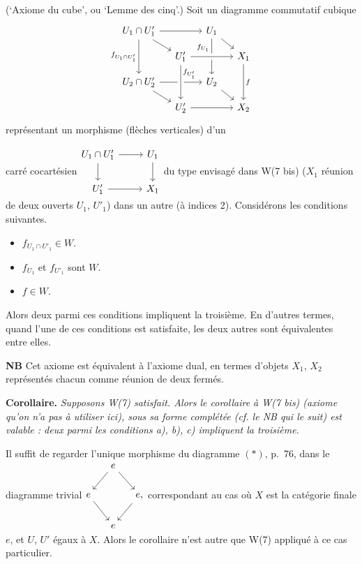 \documentclass[11pt]{article}
\newcommand{\msp}[1]{\marginpar{\footnotesize [#1]}}
\begin{document}
\begin{description}[leftmargin=5em, style=sameline]
\item[W(7)] (`Axiome du cube', ou `Lemme des cinq'.) Soit un diagramme commutatif cubique
\[
\begin{tikzcd}[row sep=small, column sep=small]
U_1\cap U'_1 \arrow[rr] \arrow[dr] \arrow[dd, "f_{U_1\cap U'_1}"'] & & U_1 \arrow[dr] \arrow[dd, "f_{U_1}"{swap,pos=.25}] & \\
& U'_1 \arrow[rr, crossing over] & & X_1 \arrow[dd, "f"] \\
U_2\cap U'_2 \arrow[rr] \arrow[dr] & & U_2 \arrow[dr] & \\
& U'_2 \arrow[rr] \arrow[from=uu, crossing over, "f_{U'_1}"{pos=.25}] & & X_2
\end{tikzcd}
\]
représentant un morphisme (flèches verticales) d'un

\msp{page 77}
carré cocartésien\quad $\vcenter{\hbox{\begin{tikzcd}
U_1\cap U'_1 \arrow[r] \arrow[d] & U_1 \arrow[d] \\
U'_1 \arrow[r] & X_1
\end{tikzcd}}}$\quad du type envisagé dans W(7 bis) ($X_1$ réunion de deux ouverts $U_1$, $U'_1$) dans un autre (à indices 2). Considérons les conditions suivantes.

\begin{itemize}
\item[a)] $f_{U_1\cap U'_1}\in W$.
\item[b)] $f_{U_1}$ et $f_{U'_1}$ sont $W$.
\item[c)] $f\in W$.
\end{itemize}

Alors deux parmi ces conditions impliquent la troisième. En d'autres termes, quand l'une de ces conditions est satisfaite, les deux autres sont équivalentes entre elles.
\end{description}

\textbf{NB} Cet axiome est équivalent à l'axiome dual, en termes d'objets $X_1$, $X_2$ représentés chacun comme réunion de deux fermés.

\textbf{Corollaire.} \textit{Supposons \textup{W(7)} satisfait. Alors le corollaire à \textup{W(7 bis)} (axiome qu'on n'a pas à utiliser ici), sous sa forme complétée (cf. le NB qui le suit) est valable : deux parmi les conditions a), b), c) impliquent la troisième.}

Il suffit de regarder l'unique morphisme du diagramme $(*)$, p.~76, dans le diagramme trivial\quad $\vcenter{\hbox{\begin{tikzcd}[column sep=small]
& e \arrow[dl] \arrow[dr] & \\
e \arrow[dr] & & e, \arrow[dl] \\
& e &
\end{tikzcd}}}$\quad correspondant au cas où $X$ est la catégorie finale $e$, et $U$, $U'$ égaux à $X$. Alors le corollaire n'est autre que W(7) appliqué à ce cas particulier.
\end{document}

